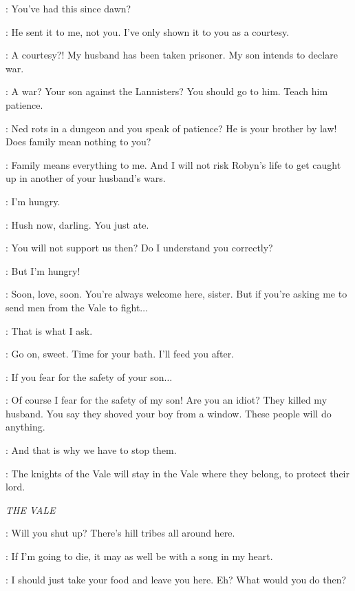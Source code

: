 \CATELYN: You've had this since dawn? 

\LYSA: He sent it to me, not you. I've only shown it to you as a courtesy. 

\CATELYN: A courtesy?! My husband has been taken prisoner. My son intends to declare war. 

\LYSA: A war? Your son against the Lannisters? You should go to him. Teach him patience. 

\CATELYN: Ned rots in a dungeon and you speak of patience? He is your brother by law! Does family mean nothing to you? 

\LYSA: Family means everything to me. And I will not risk Robyn's life to get caught up in another of your husband's wars. 

\ROBYN: I'm hungry. 

\LYSA: Hush now, darling. You just ate. 

\CATELYN: You will not support us then? Do I understand you correctly? 

\ROBYN: But I'm hungry! 

\LYSA: Soon, love, soon. You're always welcome here, sister. But if you're asking me to send men from the Vale to fight$\ldots$  

\CATELYN: That is what I ask. 

\LYSA: Go on, sweet. Time for your bath. I'll feed you after. 


\CATELYN: If you fear for the safety of your son$\ldots$  

\LYSA: Of course I fear for the safety of my son! Are you an idiot? They killed my husband. You say they shoved your boy from a window. These people will do anything. 

\CATELYN: And that is why we have to stop them. 

\LYSA: The knights of the Vale will stay in the Vale where they belong, to protect their lord. 


\scene

\textit{THE VALE} 


\BRONN: Will you shut up? There's hill tribes all around here. 

\TYRION: If I'm going to die, it may as well be with a song in my heart. 

\BRONN: I should just take your food and leave you here. Eh? What would you do then? 

